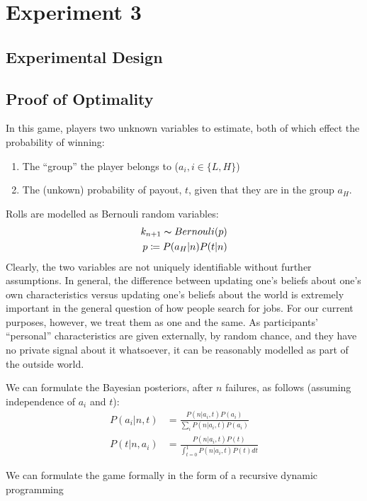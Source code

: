 \documentclass[a4paper,12pt]{article}
\begin{document}
\section{ Experiment 3 }

\subsection{ Experimental Design }

\subsection{ Proof of Optimality }

In this game, players two unknown variables to estimate, both of which effect the probability of winning:

\begin{enumerate}
\item The ``group'' the player belongs to ($a_i, i \in \{L,H\}$)
\item The (unkown) probability of payout, $t$, given that they are in the group $a_H$.
\end{enumerate}
%
Rolls are modelled as Bernouli random variables:
\begin{align*}
k_{n+1} \thicksim Bernouli( p ) \\
p \coloneqq P(a_H | n)P(t | n)
\end{align*}
Clearly, the two variables are not uniquely identifiable without further assumptions. In general, the difference between updating one's beliefs about one's own characteristics versus updating one's beliefs about the world is extremely important in the general question of how people search for jobs. For our current purposes, however, we treat them as one and the same. As participants' ``personal'' characteristics are given externally, by random chance, and they have no private signal about it whatsoever, it can be reasonably modelled as part of the outside world.

We can formulate the Bayesian posteriors, after $n$ failures, as follows (assuming independence of $a_i$ and $t$):
\begin{align*}
  P(a_i | n,t) &= \frac{P(n | a_i, t) P(a_i)}{\sum_{i} P(n | a_i, t) P(a_i)} \\
  P(t | n,a_i) &= \frac{P(n | a_i, t) P(t)}{\int_{t=0}^1 P(n | a_i, t) P(t) dt}
\end{align*}

We can formulate the game formally in the form of a recursive dynamic programming
\end{document}
